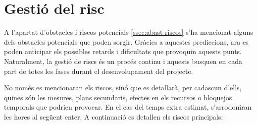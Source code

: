 \section{Gestió del risc} \label{section:gestio_risc}
A l'apartat d'obstacles i riscos potencials \ref{ssec:abast-riscos} s'ha mencionat alguns dels obstacles potencials que poden sorgir. Gràcies a aquestes prediccions, ara es poden anticipar els possibles retards i dificultats que provoquin aquests punts. Naturalment, la gestió de riscs és un procés continu i aquests busquen en cada part de totes les fases durant el desenvolupament del projecte.

No només es mencionaran els riscos, sinó que es detallarà, per cadascun d'ells, quines són les mesures, plans secundaris, efectes en els recursos o bloquejos temporals que podrien provocar. En el cas del temps extra estimat, s'arrodoniran les hores al següent enter. A continuació es detallen els riscos principals:


